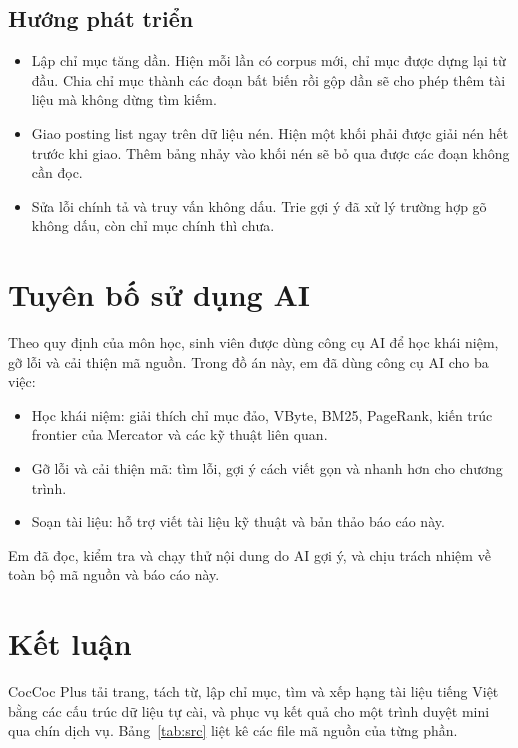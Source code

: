 \documentclass[9pt,twocolumn,a4paper]{extarticle}
\begin{document}
\subsection{Hướng phát triển}
\begin{itemize}\itemsep0pt
\item Lập chỉ mục tăng dần. Hiện mỗi lần có corpus mới, chỉ mục được dựng lại từ đầu. Chia chỉ mục thành các đoạn bất biến rồi gộp dần sẽ cho phép thêm tài liệu mà không dừng tìm kiếm.
\item Giao posting list ngay trên dữ liệu nén. Hiện một khối phải được giải nén hết trước khi giao. Thêm bảng nhảy vào khối nén sẽ bỏ qua được các đoạn không cần đọc.
\item Sửa lỗi chính tả và truy vấn không dấu. Trie gợi ý đã xử lý trường hợp gõ không dấu, còn chỉ mục chính thì chưa.
\end{itemize}

\section{Tuyên bố sử dụng AI}
\label{chap:ai}
Theo quy định của môn học, sinh viên được dùng công cụ AI để học khái niệm, gỡ lỗi và cải thiện mã nguồn. Trong đồ án này, em đã dùng công cụ AI cho ba việc:
\begin{itemize}\itemsep0pt
\item Học khái niệm: giải thích chỉ mục đảo, VByte, BM25, PageRank, kiến trúc frontier của Mercator và các kỹ thuật liên quan.
\item Gỡ lỗi và cải thiện mã: tìm lỗi, gợi ý cách viết gọn và nhanh hơn cho chương trình.
\item Soạn tài liệu: hỗ trợ viết tài liệu kỹ thuật và bản thảo báo cáo này.
\end{itemize}
Em đã đọc, kiểm tra và chạy thử nội dung do AI gợi ý, và chịu trách nhiệm về toàn bộ mã nguồn và báo cáo này.

\section{Kết luận}
\label{chap:end}
CocCoc Plus tải trang, tách từ, lập chỉ mục, tìm và xếp hạng tài liệu tiếng Việt bằng các cấu trúc dữ liệu tự cài, và phục vụ kết quả cho một trình duyệt mini qua chín dịch vụ. Bảng~\ref{tab:src} liệt kê các file mã nguồn của từng phần.
\end{document}
